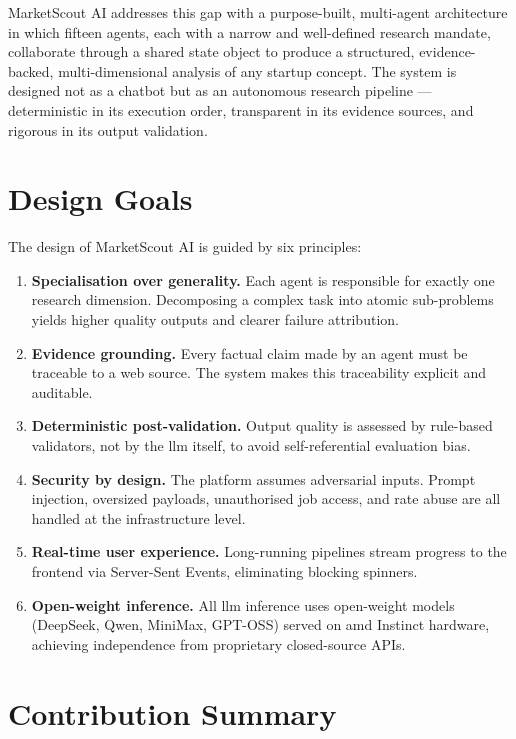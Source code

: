 \documentclass[12pt,a4paper,oneside]{book}
\begin{document}
MarketScout AI addresses this gap with a purpose-built, multi-agent architecture in which fifteen agents, each with a narrow and well-defined research mandate, collaborate through a shared state object to produce a structured, evidence-backed, multi-dimensional analysis of any startup concept. The system is designed not as a chatbot but as an autonomous research pipeline — deterministic in its execution order, transparent in its evidence sources, and rigorous in its output validation.

\section{Design Goals}

The design of MarketScout AI is guided by six principles:

\begin{enumerate}[leftmargin=1.5cm]
  \item \textbf{Specialisation over generality.} Each agent is responsible for exactly one research dimension. Decomposing a complex task into atomic sub-problems yields higher quality outputs and clearer failure attribution.
  \item \textbf{Evidence grounding.} Every factual claim made by an agent must be traceable to a web source. The system makes this traceability explicit and auditable.
  \item \textbf{Deterministic post-validation.} Output quality is assessed by rule-based validators, not by the \gls{llm} itself, to avoid self-referential evaluation bias.
  \item \textbf{Security by design.} The platform assumes adversarial inputs. Prompt injection, oversized payloads, unauthorised job access, and rate abuse are all handled at the infrastructure level.
  \item \textbf{Real-time user experience.} Long-running pipelines stream progress to the frontend via Server-Sent Events, eliminating blocking spinners.
  \item \textbf{Open-weight inference.} All \gls{llm} inference uses open-weight models (DeepSeek, Qwen, MiniMax, GPT-OSS) served on \gls{amd} Instinct hardware, achieving independence from proprietary closed-source APIs.
\end{enumerate}

\section{Contribution Summary}
\end{document}
